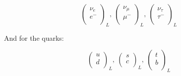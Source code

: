 \begin{equation}
  \label{eq:lepDoublets}
  \begin{pmatrix}
    \nu_e \\
    e^{-} \\
  \end{pmatrix}_L,\:  
  \begin{pmatrix}                                                                                                                \nu_\mu \\
    \mu^{-} \\
  \end{pmatrix}_L,\: 
  \begin{pmatrix}                                                                                                            
    \nu_\tau \\
    \tau^{-} \\
  \end{pmatrix}_L
\end{equation}

And for the quarks:

\begin{equation}        
  \label{eq:quarkDoublets}
  \begin{pmatrix}                                                                                                                               
    u \\                                                                                                                                  
    d \\                                                                                                                                  
  \end{pmatrix}_L,\:                                                                                                                           
  \begin{pmatrix}                                                                                         
    s \\                                         
    c \\                                                                                                                             
  \end{pmatrix}_L,\:                                                                                                                           
  \begin{pmatrix}     
    t \\                                                                                                                            
    b \\                                                                                                                            
  \end{pmatrix}_L                
\end{equation}

